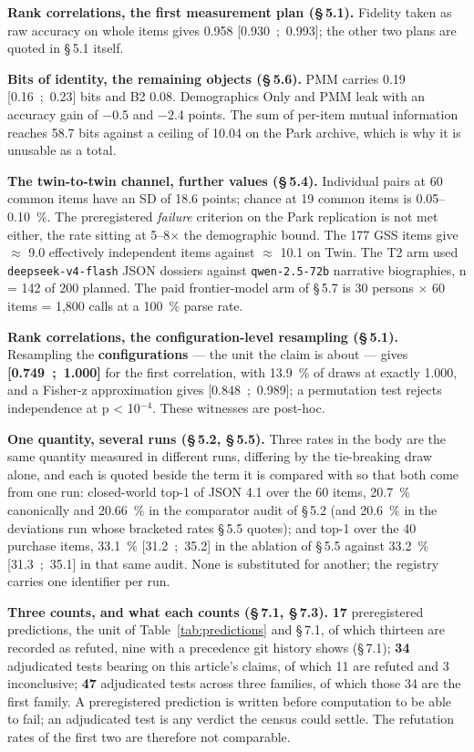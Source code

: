 \documentclass[sigconf,anonymous,review]{acmart}
\begin{document}
\textbf{Rank correlations, the first measurement plan (\S\,5.1).} Fidelity taken as raw accuracy on whole items gives 0.958 [0.930~;~0.993]; the other two plans are quoted in \S\,5.1 itself.

\textbf{Bits of identity, the remaining objects (\S\,5.6).} PMM carries 0.19 [0.16~;~0.23] bits and B2 0.08. Demographics Only and PMM leak with an accuracy gain of $-0$.5 and $-2$.4 points. The sum of per-item mutual information reaches 58.7 bits against a ceiling of 10.04 on the Park archive, which is why it is unusable as a total.

\textbf{The twin-to-twin channel, further values (\S\,5.4).} Individual pairs at 60 common items have an SD of 18.6 points; chance at 19 common items is 0.05--0.10~\%. The preregistered \textit{failure} criterion on the Park replication is not met either, the rate sitting at 5--8$\times$ the demographic bound. The 177 GSS items give $\approx$ 9.0 effectively independent items against $\approx$ 10.1 on Twin. The T2 arm used \texttt{deepseek-\allowbreak{}v4-\allowbreak{}flash} JSON dossiers against \texttt{qwen-\allowbreak{}2\allowbreak{}.5-\allowbreak{}72b} narrative biographies, n = 142 of 200 planned. The paid frontier-model arm of \S\,5.7 is 30 persons $\times$ 60 items = 1,800 calls at a 100~\% parse rate.

\textbf{Rank correlations, the configuration-level resampling (\S\,5.1).} Resampling the \textbf{configurations} --- the unit the claim is about --- gives \textbf{[0.749~;~1.000]} for the first correlation, with 13.9~\% of draws at exactly 1.000, and a Fisher-z approximation gives [0.848~;~0.989]; a permutation test rejects independence at p < 10$^{-4}$. These witnesses are post-hoc.

\textbf{One quantity, several runs (\S\,5.2, \S\,5.5).} Three rates in the body are the same quantity measured in different runs, differing by the tie-breaking draw alone, and each is quoted beside the term it is compared with so that both come from one run: closed-world top-1 of JSON 4.1 over the 60 items, 20.7~\% canonically and 20.66~\% in the comparator audit of \S\,5.2 (and 20.6~\% in the deviations run whose bracketed rates \S\,5.5 quotes); and top-1 over the 40 purchase items, 33.1~\% [31.2~;~35.2] in the ablation of \S\,5.5 against 33.2~\% [31.3~;~35.1] in that same audit. None is substituted for another; the registry carries one identifier per run.

\textbf{Three counts, and what each counts (\S\,7.1, \S\,7.3).} \textbf{17} preregistered predictions, the unit of Table~\ref{tab:predictions} and \S\,7.1, of which thirteen are recorded as refuted, nine with a precedence git history shows (\S\,7.1); \textbf{34} adjudicated tests bearing on this article's claims, of which 11 are refuted and 3 inconclusive; \textbf{47} adjudicated tests across three families, of which those 34 are the first family. A preregistered prediction is written before computation to be able to fail; an adjudicated test is any verdict the census could settle. The refutation rates of the first two are therefore not comparable.
\end{document}
